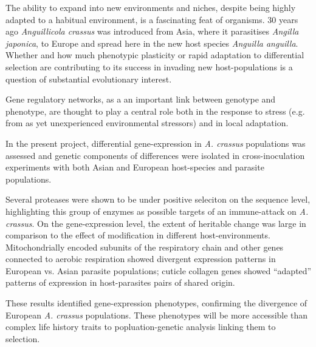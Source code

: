


\begin{abstracts}        %

  The ability to expand into new environments and niches, despite
  being highly adapted to a habitual environment, is a fascinating
  feat of organisms. 30 years ago \textit{Anguillicola crassus} was
  introduced from Asia, where it parasitises \textit{Angilla
    japonica}, to Europe and spread here in the new host species
  \textit{Anguilla anguilla}. Whether and how much phenotypic
  plasticity or rapid adaptation to differential selection are
  contributing to its success in invading new host-populations is a
  question of substantial evolutionary interest.

  Gene regulatory networks, as a an important link between genotype
  and phenotype, are thought to play a central role both in the
  response to stress (e.g. from as yet unexperienced environmental
  stressors) and in local adaptation.

  In the present project, differential gene-expression in
  \textit{A. crassus} populations was assessed and genetic components
  of differences were isolated in cross-inoculation experiments with
  both Asian and European host-species and parasite populations.

  Several proteases were shown to be under positive seleciton on the
  sequence level, highlighting this group of enzymes as possible
  targets of an immune-attack on \textit{A. crassus}. On the
  gene-expression level, the extent of heritable change was large in
  comparison to the effect of modification in different
  host-environments. Mitochondrially encoded subunits of the
  respiratory chain and other genes connected to aerobic respiration
  showed divergent expression patterns in European vs. Asian parasite
  populations; cuticle collagen genes showed ``adapted'' patterns of
  expression in host-parasites pairs of shared origin.
  
  These results identified gene-expression phenotypes, confirming the
  divergence of European \textit{A. crassus} populations. These
  phenotypes will be more accessible than complex life history traits
  to popluation-genetic analysis linking them to selection.
  

\end{abstracts}



     